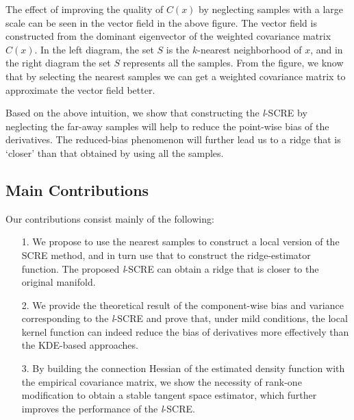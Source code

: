 \documentclass[aos,preprint]{imsart}
\theoremstyle{remark}
\begin{document}
The effect of improving the quality of $C(x)$ by neglecting samples with a large scale can be seen in the vector field in the above figure. The vector field is constructed from the dominant eigenvector of the weighted covariance matrix $C(x)$. In the left diagram, the set $S$ is the $k$-nearest neighborhood of $x$, and in the right diagram the set $S$ represents all the samples. From the figure, we know that by selecting the nearest samples we can get a weighted covariance matrix to approximate the vector field better.

Based on the above intuition, we show that constructing the {\it l}-SCRE by neglecting the far-away samples will help to reduce the point-wise bias of the derivatives. The reduced-bias phenomenon will further lead us to a ridge that is `closer' than that obtained by using all the samples.
 \subsection{Main Contributions}
Our contributions consist mainly of the following:
\begin{itemize}
\item[1.] We propose to use the nearest samples to construct a local version of the SCRE method, and in turn use that to construct the ridge-estimator function. The proposed {\it l}-SCRE  can obtain a ridge that is closer to the original manifold.
\item[2.] We provide the theoretical result of the component-wise bias and variance corresponding to the {\it l}-SCRE and prove that, under mild conditions, the local kernel function can indeed reduce the bias of derivatives more effectively than the KDE-based approaches.
\item[3.] By building the connection Hessian of the estimated density function with the empirical covariance matrix, we show the necessity of rank-one modification to obtain a stable tangent space estimator, which further improves the performance of the {\it l}-SCRE.
\end{itemize}
\end{document}
